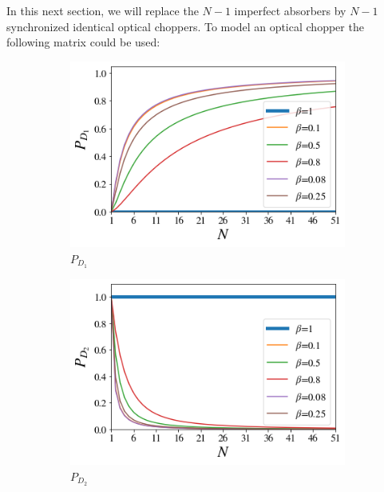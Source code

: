 \documentclass[12pt]{book}
\begin{document}
In this next section, we will replace the $N-1$ imperfect absorbers by $N-1$ synchronized identical optical choppers. To model an optical chopper the following matrix could be used:
 \begin{figure}[!t]
 
\centering
\begin{subfigure}[b]{0.45\linewidth}
\includegraphics[width=\linewidth]{images/ChopperD1.png}
\caption{$P_{D_{1}}$}
\label{fig:BS1}
\end{subfigure}
\begin{subfigure}[b]{0.45\linewidth}
\includegraphics[width=\linewidth]{images/ChopperD2.png}
\caption{$P_{D_{2}}$}
\label{fig:westminster_aerea}
\end{subfigure}
\begin{subfigure}[b]{0.45\linewidth}

\end{subfigure}
\end{figure}
\end{document}
